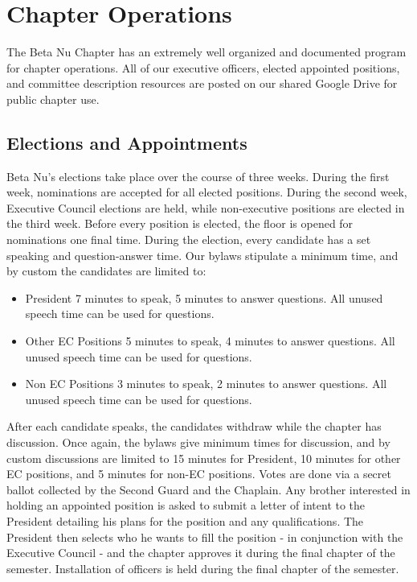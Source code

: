 \chapter{Chapter Operations}

  The Beta Nu Chapter has an extremely well organized and documented program for chapter operations. All of our executive officers, elected appointed positions, and committee description resources are posted on our shared Google Drive for public chapter use.
  
  \section*{Elections and Appointments}
    Beta Nu's elections take place over the course of three weeks. During the first week, nominations are accepted for all elected positions. During the second week, Executive Council elections are held, while non-executive positions are elected in the third week. Before every position is elected, the floor is opened for nominations one final time. During the election, every candidate has a set speaking and question-answer time. Our bylaws stipulate a minimum time, and by custom the candidates are limited to:
    
    \begin{itemize}
    	\item President 
	  7 minutes to speak, 5 minutes to answer questions. All unused speech time
	  can be used for questions.
	  
	\item Other EC Positions
	  5 minutes to speak, 4 minutes to answer questions. All unused speech time can
	  be used for questions.
	  
	\item Non EC Positions
	  3 minutes to speak, 2 minutes to answer questions. All unused speech time can
	  be used for questions.
    \end{itemize}
    
    After each candidate speaks, the candidates withdraw while the chapter has discussion. Once again, the bylaws give minimum times for discussion, and by custom discussions are limited to 15 minutes for President, 10 minutes for other EC positions, and 5 minutes for non-EC positions. Votes are done via a secret ballot collected by the Second Guard and the Chaplain. Any brother interested in holding an appointed position is asked to submit a letter of intent to the President detailing his plans for the position and any qualifications. The President then selects who he wants to fill the position - in conjunction with the Executive Council - and the chapter approves it during the final chapter of the semester. Installation of officers is held during the final chapter of the semester. 
    
